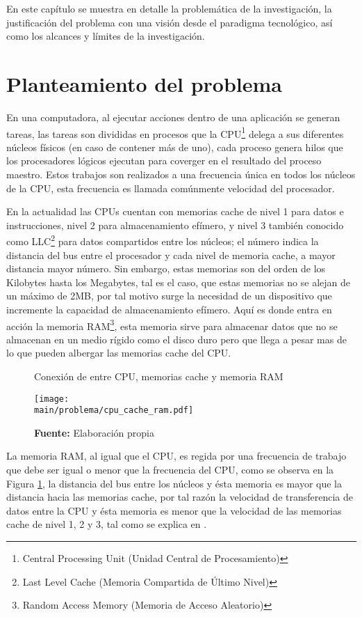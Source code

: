 \documentclass[../main/main.tex]{subfiles}
\begin{document}
\espacio

  En este capítulo se muestra en detalle la problemática de la investigación, la justificación del problema con una visión desde el paradigma tecnológico, así como los alcances y límites de la investigación.

  \section{Planteamiento del problema}

  En una computadora, al ejecutar acciones dentro de una aplicación se generan tareas, las tareas son divididas en procesos que la CPU\footnote{Central Processing Unit (Unidad Central de Procesamiento)} delega a sus diferentes núcleos físicos (en caso de contener más de uno), cada proceso genera hilos que los procesadores lógicos ejecutan para coverger en el resultado del proceso maestro. Estos trabajos son realizados a una frecuencia única en todos los núcleos de la CPU, esta frecuencia es llamada comúnmente velocidad del procesador.

  En la actualidad las CPUs cuentan con memorias cache de nivel 1 para datos e instrucciones, nivel 2 para almacenamiento efímero, y nivel 3 también conocido como LLC\footnote{Last Level Cache (Memoria Compartida de Último Nivel)} para datos compartidos entre los núcleos; el número indica la distancia del bus entre el procesador y cada nivel de memoria cache, a mayor distancia mayor número. Sin embargo, estas memorias son del orden de los Kilobytes hasta los Megabytes, tal es el caso, que estas memorias no se alejan de un máximo de 2MB, por tal motivo surge la necesidad de un dispositivo que incremente la capacidad de almacenamiento efímero. Aquí es donde entra en acción la memoria RAM\footnote{Random Access Memory (Memoria de Acceso Aleatorio)}, esta memoria sirve para almacenar datos que no se almacenan en un medio rígido como el disco duro pero que llega a pesar mas de lo que pueden albergar las memorias cache del CPU.

  \begin{figure}[ht]
    \centering
    \caption{Conexión de entre CPU, memorias cache y memoria RAM}
    \texttt{[image: \\main/problema/cpu\_cache\_ram.pdf]}
    \caption*{\textbf{Fuente:} Elaboración propia}
    \label{fig:cpu_cache_ram}
  \end{figure}

  La memoria RAM, al igual que el CPU, es regida por una frecuencia de trabajo que debe ser igual o menor que la frecuencia del CPU, como se observa en la Figura \ref{fig:cpu_cache_ram}, la distancia del bus entre los núcleos y ésta memoria es mayor que la distancia hacia las memorias cache, por tal razón la velocidad de transferencia de datos entre la CPU y ésta memoria es menor que la velocidad de las memorias cache de nivel 1, 2 y 3, tal como se explica en \cite[p.~126]{book:computer_architecture_stallings}.
\end{document}
